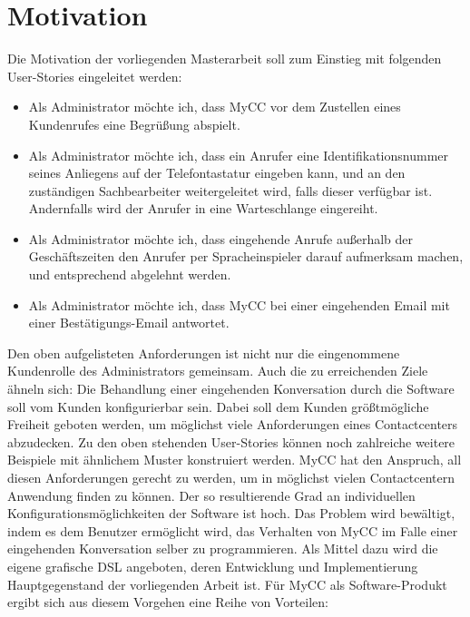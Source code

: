 \section{Motivation}
\label{sec:Motivation}
Die Motivation der vorliegenden Masterarbeit soll zum Einstieg mit folgenden User-Stories eingeleitet werden:
\begin{itemize}
\item Als Administrator möchte ich, dass MyCC vor dem Zustellen eines Kundenrufes eine Begrüßung abspielt.
\item Als Administrator möchte ich, dass ein Anrufer eine Identifikationsnummer seines Anliegens auf der Telefontastatur eingeben kann, und an den zuständigen Sachbearbeiter weitergeleitet wird, falls dieser verfügbar ist. Andernfalls wird der Anrufer in eine Warteschlange eingereiht. 
\item Als Administrator möchte ich, dass eingehende Anrufe außerhalb der Ge\-schäftszeiten den Anrufer per Spracheinspieler darauf aufmerksam machen, und entsprechend abgelehnt werden.
\item Als Administrator möchte ich, dass MyCC bei einer eingehenden Email mit einer Bestätigungs-Email antwortet.
\end{itemize}
Den oben aufgelisteten Anforderungen ist nicht nur die eingenommene Kundenrolle des Administrators gemeinsam. Auch die zu erreichenden Ziele ähneln sich: Die Behandlung einer eingehenden Konversation durch die Software soll vom Kunden konfigurierbar sein. Dabei soll dem Kunden größtmögliche Freiheit geboten werden, um möglichst viele Anforderungen eines Contactcenters abzudecken. Zu den oben stehenden User-Stories können noch zahlreiche weitere Beispiele mit ähnlichem Muster konstruiert werden. MyCC hat den Anspruch, all diesen Anforderungen gerecht zu werden, um in möglichst vielen Contactcentern Anwendung finden zu können. Der so resultierende Grad an individuellen Konfigurationsmöglichkeiten der Software ist hoch. Das Problem wird bewältigt, indem es dem Benutzer ermöglicht wird, das Verhalten von MyCC im Falle einer eingehenden Konversation selber zu programmieren. Als Mittel dazu wird die eigene grafische DSL angeboten, deren Entwicklung und Implementierung Hauptgegenstand der vorliegenden Arbeit ist.
\newpage
\noindent Für MyCC als Software-Produkt ergibt sich aus diesem Vorgehen eine Reihe von Vorteilen:

